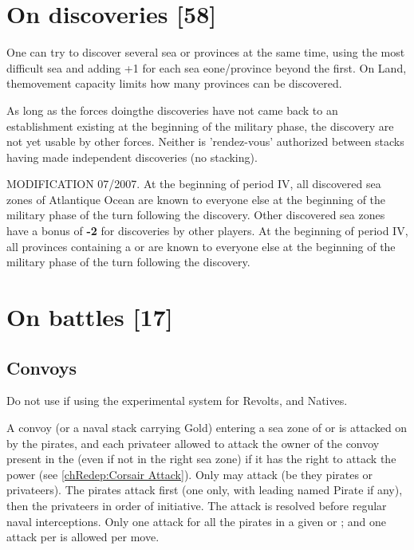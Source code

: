 \section{On discoveries [58]}\label{chMilitary:Discoveries}
\aparag One can try to discover several sea or provinces at the same time, using the most difficult
sea and adding +1 for each sea eone/province beyond the first. On Land, themovement capacity
limits how many provinces can be discovered.

\aparag As long as the forces doingthe discoveries have not came back to an establishment
existing at the beginning of the military phase, the discovery are not yet usable by other forces.
Neither is 'rendez-vous' authorized between stacks having made independent discoveries (no
stacking).

MODIFICATION 07/2007.
\bparag[On sea] At the beginning of period IV, all discovered sea zones of Atlantique
Ocean are known to everyone else at the beginning of the military phase of the turn following the discovery. Other discovered sea zones have a bonus of {\bf -2} for discoveries by other players.
\bparag [On land] At the beginning of period IV, all provinces containing a \COL or \TP are known to 
everyone else at the beginning of the military phase of the turn following the discovery.



\section{On battles [17]}

\subsection{Convoys}\label{chMilitary:Convoys}
Do not use if using the experimental system for Revolts, \corsaire and Natives.

A convoy (or a naval stack carrying Gold)
entering a sea zone of \STZ or \CTZ is attacked on
 by the pirates, and each
privateer allowed to attack the owner of the convoy present in the \STZ
(even if not in the right sea zone) if it has the right to attack the
power (see \ref{chRedep:Corsair Attack}).
\bparag Only \corsaire\faceplus may attack (be they pirates or
privateers).
\bparag The pirates attack first (one only, with leading
named Pirate if any), then the privateers in order of initiative. The
attack is resolved before regular naval interceptions.
\bparag Only one attack for all the pirates in a given \STZ or \CTZ; and
one attack per \corsaire is allowed per move.

